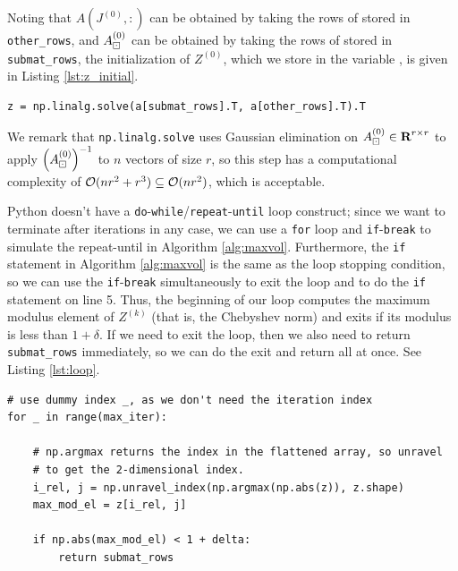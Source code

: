 \documentclass{article}
\begin{document}
	Noting that $A\left(J^{(0)}, :\right)$ can be obtained by taking the rows of \va{} stored in \texttt{other\_rows}, and $A_\boxdot^{(0)}$ can be obtained by taking the rows of \va{} stored in \texttt{submat\_rows}, the initialization of $Z^{(0)}$, which we store in the variable \vz{}, is given in Listing \ref{lst:z_initial}.
	\begin{lstlisting}[caption={$Z^{(0)}$ initialization}, label=lst:z_initial]
z = np.linalg.solve(a[submat_rows].T, a[other_rows].T).T
	\end{lstlisting}
	We remark that \texttt{np.linalg.solve} uses Gaussian elimination on $A_\boxdot^{(0)} \in \textnormal{\bf R}^{r\times r}$ to apply $\left(A_\boxdot^{(0)}\right)^{-1}$ to $n$ vectors of size $r$, so this step has a computational complexity of $\mathcal{O}(nr^2 + r^3) \subseteq \mathcal{O}(nr^2)$, which is acceptable.
	
	
	Python doesn't have a \texttt{do}-\texttt{while}/\texttt{repeat}-\texttt{until} loop construct; since we want to terminate after \vmaxiter{} iterations in any case, we can use a \texttt{for} loop and \texttt{if}-\texttt{break} to simulate the repeat-until in Algorithm \ref{alg:maxvol}. Furthermore, the \texttt{if} statement in Algorithm \ref{alg:maxvol} is the same as the loop stopping condition, so we can use the \texttt{if}-\texttt{break} simultaneously to exit the loop and to do the \texttt{if} statement on line 5. Thus, the beginning of our loop computes the maximum modulus element of $Z^{(k)}$ (that is, the Chebyshev norm) and exits if its modulus is less than $1 + \delta$. If we need to exit the loop, then we also need to return \texttt{submat\_rows} immediately, so we can do the exit and return all at once. See Listing \ref{lst:loop}.
	\begin{lstlisting}[caption={loop setup}, label=lst:loop]
# use dummy index _, as we don't need the iteration index
for _ in range(max_iter):

    # np.argmax returns the index in the flattened array, so unravel
    # to get the 2-dimensional index.
    i_rel, j = np.unravel_index(np.argmax(np.abs(z)), z.shape)
    max_mod_el = z[i_rel, j]
    
    if np.abs(max_mod_el) < 1 + delta:
        return submat_rows
	\end{lstlisting}
	
	
\end{document}
